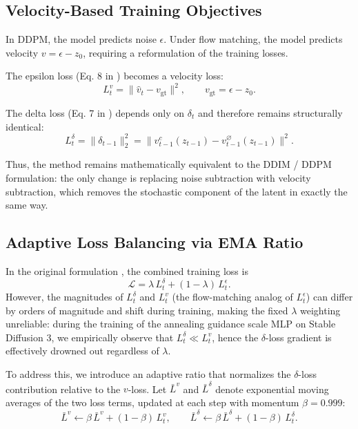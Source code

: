 \documentclass[acmtog]{acmart}
\begin{document}
\subsection{Velocity-Based Training Objectives}

In DDPM, the model predicts noise $\epsilon$. Under flow matching, the model predicts velocity $v = \epsilon - z_0$, requiring a reformulation of the training losses.

The epsilon loss (Eq. 8 in \citep{dahary2025annealing}) becomes a velocity loss:
\begin{equation}
L_t^{v} = \| \hat{v}_t - v_{\text{gt}} \|^2,
\qquad
v_{\text{gt}} = \epsilon - z_0.
\end{equation}

The delta loss (Eq. 7 in \citep{dahary2025annealing}) depends only on $\delta_t$ and therefore remains structurally identical:
\begin{equation}
L_t^{\delta} =
\| \delta_{t-1} \|_2^2 = \| v_{t-1}^{c}(z_{t-1}) - v_{t-1}^{\varnothing}(z_{t-1}) \|^2.
\end{equation}

Thus, the method remains mathematically equivalent to the DDIM / DDPM formulation: the only change is replacing noise subtraction with velocity subtraction, which removes the stochastic component of the latent in exactly the same way.

\subsection{Adaptive Loss Balancing via EMA Ratio}

In the original formulation \citep{dahary2025annealing}, the combined training loss is
\begin{equation}
\mathcal{L} = \lambda\, L_t^{\delta} + (1-\lambda)\, L_t^{\epsilon}.
\end{equation}
However, the magnitudes of $L_t^{\delta}$ and $L_t^{v}$ (the flow-matching analog of $L_t^{\epsilon}$) can differ by orders of magnitude and shift during training, making the fixed $\lambda$ weighting unreliable: during the training of the annealing guidance scale MLP on Stable Diffusion 3, we empirically observe that $L_t^{\delta} \ll L_t^{v}$, hence the $\delta$-loss gradient is effectively drowned out regardless of $\lambda$.

To address this, we introduce an adaptive ratio that normalizes the $\delta$-loss contribution relative to the $v$-loss. Let $\bar{L}^{v}$ and $\bar{L}^{\delta}$ denote exponential moving averages of the two loss terms, updated at each step with momentum $\beta = 0.999$:
\begin{equation}
\bar{L}^{v} \leftarrow \beta\, \bar{L}^{v} + (1-\beta)\, L_t^{v},
\qquad
\bar{L}^{\delta} \leftarrow \beta\, \bar{L}^{\delta} + (1-\beta)\, L_t^{\delta}.
\end{equation}
\end{document}
